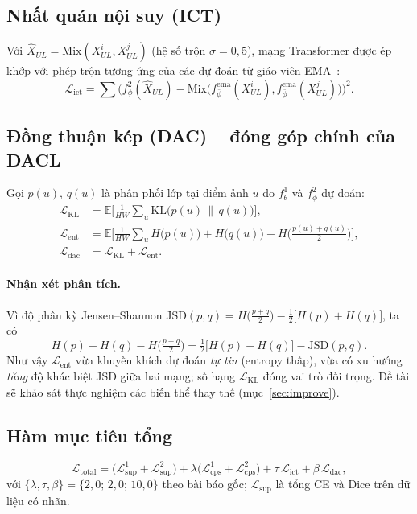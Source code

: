 \documentclass[12pt,a4paper]{article}
\newcommand{\Lict}{\mathcal{L}_{\mathrm{ict}}}
\newcommand{\Ldac}{\mathcal{L}_{\mathrm{dac}}}
\newcommand{\Lkl}{\mathcal{L}_{\mathrm{KL}}}
\newcommand{\Lent}{\mathcal{L}_{\mathrm{ent}}}
\begin{document}
\subsection{Nhất quán nội suy (ICT)}
Với $\hat X_{UL}=\mathrm{Mix}(X^i_{UL},X^j_{UL})$ (hệ số trộn $\sigma=0{,}5$), mạng
Transformer được ép khớp với phép trộn tương ứng của các dự đoán từ giáo viên
EMA~\cite{verma2022ict}:
\begin{equation}
  \Lict=\sum\Big(f^2_\phi(\hat X_{UL})-\mathrm{Mix}\big(f^{\mathrm{ema}}_{\bar\phi}(X^i_{UL}),
  f^{\mathrm{ema}}_{\bar\phi}(X^j_{UL})\big)\Big)^2 .
\end{equation}

\subsection{Đồng thuận kép (DAC) -- đóng góp chính của DACL}
Gọi $p(u)$, $q(u)$ là phân phối lớp tại điểm ảnh $u$ do $f^1_\theta$ và $f^2_\phi$ dự đoán:
\begin{align}
  \Lkl  &= \mathbb{E}\Big[\tfrac{1}{HW}\textstyle\sum_u \mathrm{KL}\big(p(u)\,\|\,q(u)\big)\Big],\\
  \Lent &= \mathbb{E}\Big[\tfrac{1}{HW}\textstyle\sum_u
           H\big(p(u)\big)+H\big(q(u)\big)-H\big(\tfrac{p(u)+q(u)}{2}\big)\Big],\\
  \Ldac &= \Lkl + \Lent .
\end{align}

\paragraph{Nhận xét phân tích.} Vì độ phân kỳ Jensen--Shannon
$\mathrm{JSD}(p,q)=H\big(\tfrac{p+q}{2}\big)-\tfrac12\big[H(p)+H(q)\big]$, ta có
\begin{equation}
  H(p)+H(q)-H\big(\tfrac{p+q}{2}\big)=\tfrac12\big[H(p)+H(q)\big]-\mathrm{JSD}(p,q).
\end{equation}
Như vậy $\Lent$ vừa khuyến khích dự đoán \emph{tự tin} (entropy thấp), vừa có xu hướng
\emph{tăng} độ khác biệt JSD giữa hai mạng; số hạng $\Lkl$ đóng vai trò đối trọng. Đề tài
sẽ khảo sát thực nghiệm các biến thể thay thế (mục~\ref{sec:improve}).

\subsection{Hàm mục tiêu tổng}
\begin{equation}
  \mathcal{L}_{\mathrm{total}}=\big(\mathcal{L}^1_{\mathrm{sup}}+\mathcal{L}^2_{\mathrm{sup}}\big)
  +\lambda\big(\mathcal{L}^1_{\mathrm{cps}}+\mathcal{L}^2_{\mathrm{cps}}\big)
  +\tau\,\Lict+\beta\,\Ldac ,
\end{equation}
với $\{\lambda,\tau,\beta\}=\{2{,}0;\,2{,}0;\,10{,}0\}$ theo bài báo gốc;
$\mathcal{L}_{\mathrm{sup}}$ là tổng CE và Dice trên dữ liệu có nhãn.
\end{document}
